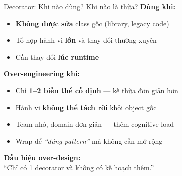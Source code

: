 \begin{frame}{Decorator: Khi nào dùng? Khi nào là thừa?}
  \textcolor{mygreen}{\textbf{Dùng khi:}}
  \begin{itemize}
    \item \textbf{Không được sửa} class gốc (library, legacy code)
    \item Tổ hợp hành vi \textbf{lớn} và thay đổi thường xuyên
    \item Cần thay đổi \textbf{lúc runtime}
  \end{itemize}

  \vspace{0.3em}
  \textcolor{myred}{\textbf{Over-engineering khi:}}
  \begin{itemize}
    \item Chỉ \textbf{1--2 biến thể cố định} --- kế thừa đơn giản hơn
    \item Hành vi \textbf{không thể tách rời} khỏi object gốc
    \item Team nhỏ, domain đơn giản --- thêm cognitive load
    \item Wrap để \textit{``đúng pattern''} mà không cần mở rộng
  \end{itemize}

  \vspace{0.3em}
  \centering
  \textcolor{myorange}{\textbf{Dấu hiệu over-design:}}\\[0.2em]
  {\small ``Chỉ có 1 decorator và không có kế hoạch thêm.''}
\end{frame}
